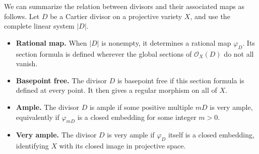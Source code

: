 \documentclass[11pt]{article}
\theoremstyle{definition}
\newcommand{\cO}{\mathcal{O}}
\newcommand{\vf}{\varphi}
\begin{document}
\Needspace{6cm}
We can summarize the relation between divisors and their associated
maps as follows. Let \(D\) be a Cartier divisor on a projective variety
\(X\), and use the complete linear system \(|D|\).
\begin{itemize}
    \item \textbf{Rational map.} When \(|D|\) is nonempty, it determines
    a rational map \(\vf_D\). Its section formula is defined wherever
    the global sections of \(\cO_X(D)\) do not all vanish.
    \item \textbf{Basepoint free.} The divisor \(D\) is basepoint free
    if this section formula is defined at every point. It then gives
    a regular morphism on all of \(X\).
    \item \textbf{Ample.} The divisor \(D\) is ample if some positive
    multiple \(mD\) is very ample, equivalently if \(\vf_{mD}\) is a
    closed embedding for some integer \(m>0\).
    \item \textbf{Very ample.} The divisor \(D\) is very ample if
    \(\vf_D\) itself is a closed embedding, identifying \(X\) with
    its closed image in projective space.
\end{itemize}
\end{document}

